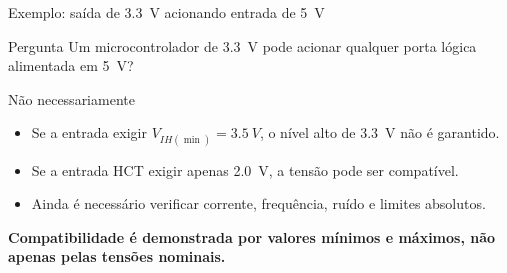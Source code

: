 \begin{frame}{Exemplo: saída de 3.3~V acionando entrada de 5~V}
    \begin{block}{Pergunta}
        Um microcontrolador de 3.3~V pode acionar qualquer porta lógica
        alimentada em 5~V?
    \end{block}

    \begin{alertblock}{Não necessariamente}
        \begin{itemize}
            \item Se a entrada exigir $V_{IH(\min)}=3.5~V$, o nível
                  alto de 3.3~V não é garantido.
            \item Se a entrada HCT exigir apenas 2.0~V, a tensão pode
                  ser compatível.
            \item Ainda é necessário verificar corrente, frequência, ruído e
                  limites absolutos.
        \end{itemize}
    \end{alertblock}

    \centering
    \textbf{Compatibilidade é demonstrada por valores mínimos e máximos,
    não apenas pelas tensões nominais.}
\end{frame}
